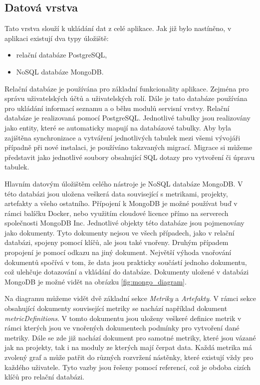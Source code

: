 \documentclass[czech,master]{diploma}
\begin{document}
\subsection{Datová vrstva}
Tato vrstva slouží k ukládání dat z celé aplikace. Jak již bylo nastíněno, v aplikaci existují dva typy úložiště:

\begin{itemize}
\item relační databáze PostgreSQL,
\item NoSQL databáze MongoDB.
\end{itemize}

Relační databáze je používána pro základní funkcionality aplikace. Zejména pro správu uživatelských účtů a uživatelských rolí. Dále je tato databáze používána pro ukládání informací seznamu a o běhu modulů servisní vrstvy. Relační databáze je realizovaná pomocí PostgreSQL. Jednotlivé tabulky jsou realizovány jako entity, které se automaticky mapují na databázové tabulky. Aby byla zajištěna synchronizace a vytváření jednotlivých tabulek mezi všemi vývojáři případně při nové instalaci, je používáno takzvaných migrací. Migrace si můžeme představit jako jednotlivé soubory obsahující SQL dotazy pro vytvoření či úpravu tabulek.

Hlavním datovým úložištěm celého nástroje je NoSQL databáze MongoDB. V této databázi jsou uložena veškerá data související s metrikami, projekty, artefakty a všeho ostatního. Přípojení k MongoDB je možné používat buď v rámci balíčku Docker, nebo využitím cloudové licence přímo na serverech společnosti MongoDB Inc. Jednotlivé objekty této databáze jsou pojmenovány jako dokumenty. Tyto dokumenty nejsou ve všech případech, jako v relační databázi, spojeny pomocí klíčů, ale jsou také vnořeny. Druhým případem propojení je pomocí odkazu na jiný dokument. Největší výhoda vnořování dokumentů spočívá v tom, že data jsou prakticky součástí jednoho dokumentu, což ulehčuje dotazování a vkládání do databáze. Dokumenty uložené v databázi MongoDB je možné vidět na obrázku \ref{fig:mongo_diagram}.

Na diagramu můžeme vidět dvě základní sekce \textit{Metriky} a \textit{Artefakty}. V rámci sekce obsahující dokumenty související metriky se nachází například dokument \textit{metricDefinitions}. V tomto dokumentu jsou uloženy veškeré definice metrik v rámci kterých jsou ve vnořených dokumentech podmínky pro vytvoření dané metriky. Dále se zde již nachází dokument pro samotné metriky, které jsou vázané jak na projekty, tak i na moduly ze kterých mají čerpat data. Každá metrika má zvolený graf a může patřit do různých rozvržení nástěnky, které existují vždy pro každého uživatele. Tyto vazby jsou řešeny pomocí  referencí, což je obdoba cizích klíčů pro relační databázi.
\end{document}
